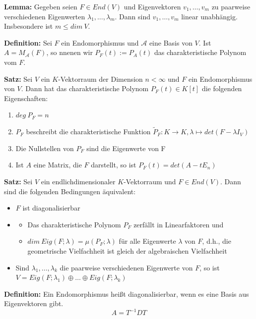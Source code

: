 \documentclass{article}
\begin{document}
\textbf{Lemma:} Gegeben seien $F\in End(V)$ und Eigenvektoren $v_1,\dots, v_m$
zu paarweise verschiedenen Eigenwerten $\lambda_1,\dots, \lambda_m$. Dann sind
$v_1,\dots,v_m$ linear unabhängig. Insbesondere ist $m\leq dim\ V$.

\textbf{Definition:} Sei $F$ ein Endomorphismus und $\mathcal{A}$ eine Basis von
$V$. Ist $A=M_\mathcal{A}(F)$, so nnenen wir $P_F(t):=P_A(t)$ das
charakteristische Polynom vom $F$.

\textbf{Satz:} Sei $V$ ein $K$-Vektorraum der Dimension $n<\infty$ und $F$ ein
Endomorphismus von $V$. Dann hat das charakteristische Polynom $P_F(t)\in K[t]$
die folgenden Eigenschaften:

\begin{enumerate}
	\item $deg\ P_F=n$
	\item $P_F$ beschreibt die charakteristische Funktion $\tilde{P}_F:K\to
		K, \lambda\mapsto det(F-\lambda I_V)$
	\item Die Nullstellen von $P_F$ sind die Eigenwerte von F
	\item Ist $A$ eine Matrix, die $F$ darstellt, so ist $P_F(t)=det(A-t E_n)$
\end{enumerate}

\textbf{Satz:} Sei $V$ ein endlichdimensionaler $K$-Vektorraum und $F\in
End(V)$. Dann sind die folgenden Bedingungen äquivalent:

\begin{itemize}
\item[i)] $F$ ist diagonalisierbar
\item[ii)]   	\begin{itemize}
			\item[a)] Das charakteristische Polynom $P_F$ zerfällt
				in Linearfaktoren und
			\item[b)] $dim\ Eig(F;\lambda)=\mu(P_F;\lambda)$ für
				alle Eigenwerte $\lambda$ von $F$, d.h., die
				geometrische Vielfachheit ist gleich der
				algebraischen Vielfachheit
		\end{itemize}
\item[iii)] Sind $\lambda_1,\dots,\lambda_k$ die paarweise verschiedenen
	Eigenwerte von $F$, so ist $V = Eig(F;\lambda_1)\oplus\dots\oplus
	Eig(F;\lambda_k)$
\end{itemize}

\textbf{Definition:} Ein Endomorphismus heißt diagonalisierbar, wenn es eine
Basis aus Eigenvektoren gibt. 
\begin{equation*}
	A=T^{-1} D T
\end{equation*}
\end{document}
